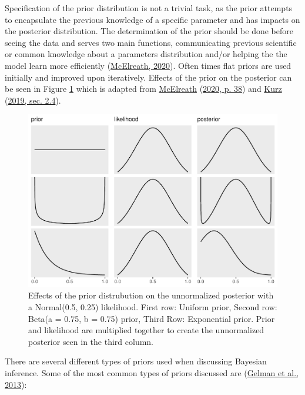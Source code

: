 \documentclass[12pt,twoside]{reedthesis}
\begin{document}
Specification of the prior distribution is not a trivial task, as the prior attempts to encapsulate the previous knowledge of a specific parameter and has impacts on the posterior distribution. The determination of the prior should be done before seeing the data and serves two main functions, communicating previous scientific or common knowledge about a parameters distribution and/or helping the the model learn more efficiently (\protect\hyperlink{ref-mcelreathStatisticalRethinkingBayesian2020}{McElreath, 2020}). Often times flat priors are used initially and improved upon iteratively. Effects of the prior on the posterior can be seen in Figure \ref{fig:prioreffects} which is adapted from \protect\hyperlink{ref-mcelreathStatisticalRethinkingBayesian2020}{McElreath} (\protect\hyperlink{ref-mcelreathStatisticalRethinkingBayesian2020}{2020, p. 38}) and \protect\hyperlink{ref-kurzStatisticalRethinkingBrms2019}{Kurz} (\protect\hyperlink{ref-kurzStatisticalRethinkingBrms2019}{2019, sec. 2.4}).
\begin{figure}
\centering
\includegraphics{thesis_files/figure-latex/prioreffects-1.pdf}
\caption{\label{fig:prioreffects}Effects of the prior distrubution on the unnormalized posterior with a Normal(0.5, 0.25) likelihood. First row: Uniform prior, Second row: Beta(a = 0.75, b = 0.75) prior, Third Row: Exponential prior. Prior and likelihood are multiplied together to create the unnormalized posterior seen in the third column.}
\end{figure}
There are several different types of priors used when discussing Bayesian inference. Some of the most common types of priors discussed are (\protect\hyperlink{ref-gelmanBayesianDataAnalysis2013}{Gelman et al., 2013}):
\end{document}
